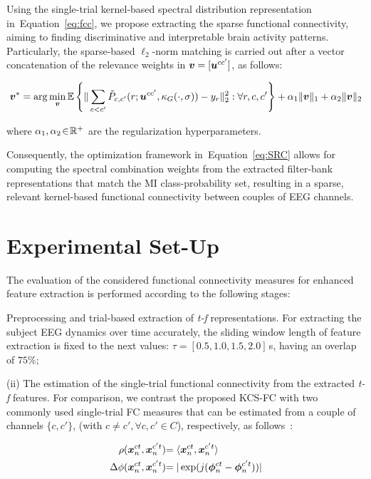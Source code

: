 Using the single-trial kernel-based spectral distribution representation in~Equation~\eqref{eq:fcc}, we propose extracting the sparse functional connectivity, aiming to finding discriminative and interpretable brain activity patterns. Particularly, the sparse-based $\ell_2$-norm matching is carried out after a vector concatenation of the relevance weights in $\bm {v}=[\bm {u}^{cc'}]$, as follows:

\begin{linenomath*}
	\begin{equation}\label{eq:SRC}
		\bm {v}^* = \arg \min_{\bm {v}} {\mathbb{E}}\left\lbrace  \| \sum_{c<c'}\tilde{P}_{c,c'}(r;\bm {u}^{cc'},\kappa_G(\cdot,\sigma))-y_r\|^2_2: \forall r, c,c' \right\rbrace + \alpha_1 \|\bm {v}\|_1 +\alpha_2 \|\bm {v}\|_2
	\end{equation}
\end{linenomath*}
where $\alpha_1,\alpha_2\negthinspace\in\negthinspace\mathbb{R}^+$ are the regularization hyperparameters.

Consequently, the optimization framework in~Equation~\eqref{eq:SRC} allows for computing the spectral combination weights from the extracted filter-bank representations that match the MI class-probability set, resulting in a sparse, relevant kernel-based functional connectivity between couples of EEG channels.


\section{Experimental Set-Up}
The evaluation of the considered functional connectivity measures for enhanced feature extraction is performed according to the following stages: 

Preprocessing and trial-based extraction of \textit{t-f} representations. For extracting the subject EEG dynamics over time accurately, the sliding window length of feature extraction is fixed to the next values: $\tau=[0.5,1.0,1.5,2.0]$\,{s}, having an overlap of $75\%$;

({ii}) The estimation of the single-trial functional connectivity from the extracted \textit{t-f} features. For comparison, we contrast the proposed KCS-FC with two commonly used single-trial FC measures that can be estimated from a couple of channels $\{c,c'\}$, (with $c\neq c', \forall c,c' \in C $), respectively, as follows~\cite{rodrigue2019}:
\begin{linenomath*}
	\begin{subequations}
		\begin{align}
			\rho(\bm {x}^{ct}_{n},\bm {x}^{c't}_{n}) & {={\langle\bm {x}^{ct}_{n},\bm {x}^{c't}_{n}}\rangle}\label{Eq:Pearson}\\			 
			{\Delta\phi(\bm {x}^{ct}_{n},\bm {x}^{c't}_{n})} & {= {|\exp(j(\bm {\phi}_n^{ct}-\bm {\phi}_n^{c't}))|}} \label{Eq:PLV} 
		\end{align}
	\end{subequations}
\end{linenomath*}


